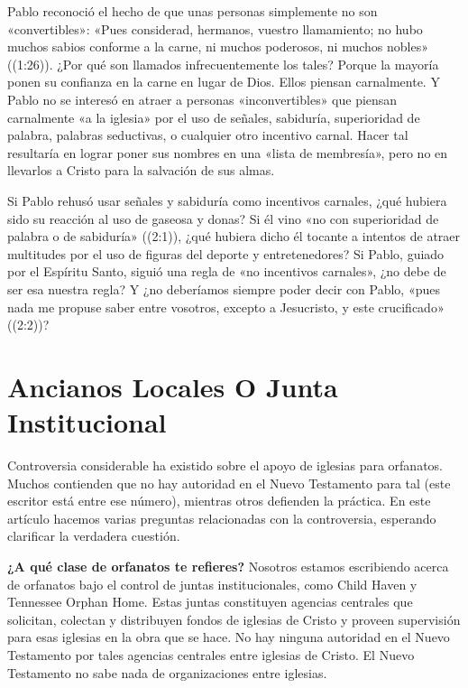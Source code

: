 \documentclass[12pt, twoside, openright]{book}
\begin{document}
Pablo reconoció el hecho de que unas personas simplemente no son «convertibles»: «Pues considerad, hermanos, vuestro llamamiento; no hubo muchos sabios conforme a la carne, ni muchos poderosos, ni muchos nobles» ((1:26)). ¿Por qué son llamados infrecuentemente los tales? Porque la mayoría ponen su confianza en la carne en lugar de Dios. Ellos piensan carnalmente. Y Pablo no se interesó en atraer a personas «inconvertibles» que piensan carnalmente «a la iglesia» por el uso de señales, sabiduría, superioridad de palabra, palabras seductivas, o cualquier otro incentivo carnal. Hacer tal resultaría en lograr poner sus nombres en una «lista de membresía», pero no en llevarlos a Cristo para la salvación de sus almas. 

Si Pablo rehusó usar señales y sabiduría como incentivos carnales, ¿qué hubiera sido su reacción al uso de gaseosa y donas? Si él vino «no con superioridad de palabra o de sabiduría» ((2:1)), ¿qué hubiera dicho él tocante a intentos de atraer multitudes por el uso de figuras del deporte y entretenedores? Si Pablo, guiado por el Espíritu Santo, siguió una regla de «no incentivos carnales», ¿no debe de ser esa nuestra regla? Y ¿no deberíamos siempre poder decir con Pablo, «pues nada me propuse saber entre vosotros, excepto a Jesucristo, y este crucificado» ((2:2))?

\section{Ancianos Locales O Junta Institucional}
Controversia considerable ha existido sobre el apoyo de iglesias para orfanatos. Muchos contienden que no hay autoridad en el Nuevo Testamento para tal (este escritor está entre ese número), mientras otros defienden la práctica. En este artículo hacemos varias preguntas relacionadas con la controversia, esperando clarificar la verdadera cuestión.

\textbf{¿A qué clase de orfanatos te refieres?} Nosotros estamos escribiendo acerca de orfanatos bajo el control de juntas institucionales, como Child Haven y Tennessee Orphan Home. Estas juntas constituyen agencias centrales que solicitan, colectan y distribuyen fondos de iglesias de Cristo y proveen supervisión para esas iglesias en la obra que se hace. No hay ninguna autoridad en el Nuevo Testamento por tales agencias centrales entre iglesias de Cristo. El Nuevo Testamento no sabe nada de organizaciones entre iglesias.
\end{document}
